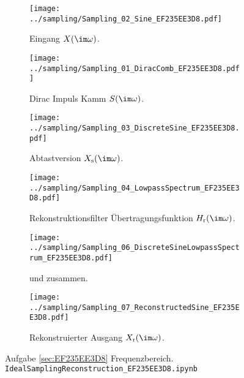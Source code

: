 









\begin{figure*}[h!]
\centering
\begin{subfigure}{0.49\textwidth}
\texttt{[image: ../sampling/Sampling\_02\_Sine\_EF235EE3D8.pdf]}
\caption{Eingang $X(\im\omega)$.}
\label{fig:Sampling_02_Sine_EF235EE3D8}
\end{subfigure}
\begin{subfigure}{0.49\textwidth}
\texttt{[image: ../sampling/Sampling\_01\_DiracComb\_EF235EE3D8.pdf]}
\caption{Dirac Impuls Kamm $S(\im\omega)$.}
\label{fig:Sampling_01_DiracComb_EF235EE3D8}
\end{subfigure}
\begin{subfigure}{0.49\textwidth}
\texttt{[image: ../sampling/Sampling\_03\_DiscreteSine\_EF235EE3D8.pdf]}
\caption{Abtastversion $X_\mathrm{s}(\im\omega)$.}
\label{fig:Sampling_03_DiscreteSine_EF235EE3D8}
\end{subfigure}
\begin{subfigure}{0.49\textwidth}
\texttt{[image: ../sampling/Sampling\_04\_LowpassSpectrum\_EF235EE3D8.pdf]}
\caption{Rekonstruktionsfilter Übertragungsfunktion $H_\mathrm{r}(\im\omega)$.}
\label{fig:Sampling_04_LowpassSpectrum_EF235EE3D8}
\end{subfigure}
\begin{subfigure}{0.49\textwidth}
\texttt{[image: ../sampling/Sampling\_06\_DiscreteSineLowpassSpectrum\_EF235EE3D8.pdf]}
\caption{
und
zusammen.
}
\label{fig:Sampling_06_DiscreteSineLowpassSpectrum_EF235EE3D8}
\end{subfigure}
\begin{subfigure}{0.49\textwidth}
\texttt{[image: ../sampling/Sampling\_07\_ReconstructedSine\_EF235EE3D8.pdf]}
\caption{Rekonstruierter Ausgang $X_\mathrm{r}(\im\omega)$.}
\label{fig:Sampling_07_ReconstructedSine_EF235EE3D8}
\end{subfigure}
\caption{Aufgabe \ref{sec:EF235EE3D8} Frequenzbereich. \texttt{IdealSamplingReconstruction\_EF235EE3D8.ipynb}}
\label{fig:EF235EE3D8_FrequencyDomain}
\end{figure*}







